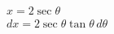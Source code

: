 \documentclass[preview]{standalone}
\begin{document}
\begin{align*}
x=2\sec\theta \\ dx=2\sec\theta\tan\theta \, d\theta
\end{align*}
\end{document}
